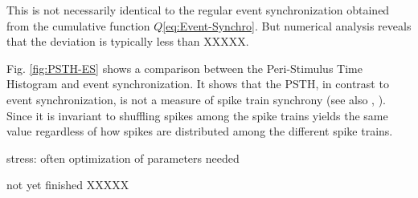 \documentclass[10pt,twocolumn]{elsart5p}
\begin{document}
This is not necessarily identical to the regular event synchronization obtained from the cumulative function $Q$\ref{eq:Event-Synchro}. But numerical analysis reveals that the deviation is typically less than XXXXX.

Fig. \ref{fig:PSTH-ES} shows a comparison between the Peri-Stimulus Time Histogram and event synchronization. It shows that the PSTH, in contrast to event synchronization, is not a measure of spike train synchrony (see also \citeauthor{Kreuz11}, \citeyear{Kreuz11}). Since it is invariant to shuffling spikes among the spike trains yields the same value regardless of how spikes are distributed among the different spike trains.

stress: often optimization of parameters needed

not yet finished XXXXX
\end{document}
